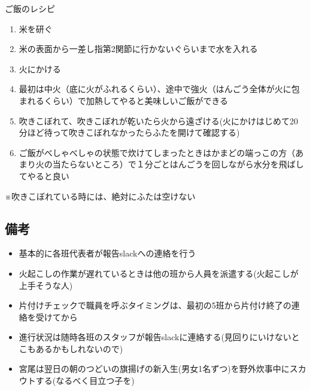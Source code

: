 \begin{itembox}[l]{ご飯のレシピ}
  \begin{enumerate}
    \item 米を研ぐ
    \item 米の表面から一差し指第2関節に行かないぐらいまで水を入れる
    \item 火にかける

    \item 最初は中火（底に火がふれるくらい）、途中で強火（はんごう全体が火に包まれるくらい）で加熱してやると美味しいご飯ができる
    \item 吹きこぼれて、吹きこぼれが乾いたら火から遠ざける(火にかけはじめて20分ほど待って吹きこぼれなかったらふたを開けて確認する)
    \item ご飯がべしゃべしゃの状態で炊けてしまったときはかまどの端っこの方（あまり火の当たらないところ）で１分ごとはんごうを回しながら水分を飛ばしてやると良い
  \end{enumerate}
※吹きこぼれている時には、絶対にふたは空けない
\end{itembox}


\subsection{備考}
\begin{itemize}
\item 基本的に各班代表者が報告slackへの連絡を行う
\item 火起こしの作業が遅れているときは他の班から人員を派遣する(火起こしが上手そうな人)
\item 片付けチェックで職員を呼ぶタイミングは、最初の5班から片付け終了の連絡を受けてから
\item 進行状況は随時各班のスタッフが報告slackに連絡する(見回りにいけないとこもあるかもしれないので)
\item 宮尾は翌日の朝のつどいの旗揚げの新入生(男女1名ずつ)を野外炊事中にスカウトする(なるべく目立つ子を)
\end{itemize}


%
